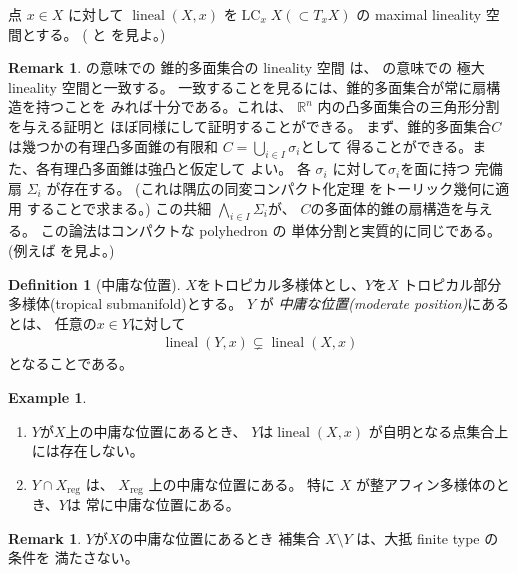 \documentclass[a4paper,dvipdfmx,reqno,12pt]{amsart}
\theoremstyle{definition}
\newtheorem{definition}[theorem]{Definition}
\newtheorem{example}[theorem]{Example}
\newtheorem{remark}[theorem]{Remark}
\newcommand{\opn}[1]{\operatorname{#1}}
\numberwithin{equation}{section}
\begin{document}
点 $x\in X$ に対して
$\opn{lineal}(X,x)$ を$\opn{LC}_x X (\subset T_x X)$
の maximal lineality 空間とする。
(\cite[]{MR4246795} と
\cite[]{demedrano2023chern} を見よ。)



\begin{remark}
\cite[]{MR3041763}の意味での
錐的多面集合の lineality 空間
は、
\cite[]{MR4246795}の意味での
極大 lineality 空間と一致する。
一致することを見るには、錐的多面集合が常に扇構造を持つことを
みれば十分である。これは、
$\mathbb{R}^{n}$ 内の凸多面集合の三角形分割を与える証明と
ほぼ同様にして証明することができる。
まず、錐的多面集合$C$は幾つかの有理凸多面錐の有限和
$C=\bigcup_{i\in I}\sigma_i$として
得ることができる。また、各有理凸多面錐は強凸と仮定して
よい。
各 $\sigma_i$ に対して$\sigma_i$を面に持つ
完備扇 $\Sigma_i$ が存在する。
(これは隅広の同変コンパクト化定理
\cite[Theorem 3]{MR337963}をトーリック幾何に適用
することで求まる。)
この共細 $\bigwedge_{i\in I}\Sigma_i$が、
$C$の多面体的錐の扇構造を与える。
この論法はコンパクトな polyhedron の
単体分割と実質的に同じである。
(例えば\cite[Theorem 2.11]{MR665919}
を見よ。)
\end{remark}

\begin{definition}[{中庸な位置}]
\label{definition-permissible-position}
$X$をトロピカル多様体とし、$Y$を$X$
トロピカル部分多様体(tropical submanifold)とする。
$Y$ が \emph{中庸な位置(moderate position)}にあるとは、
任意の$x\in Y$に対して
\begin{align}
     \opn{lineal}(Y,x) \subsetneq
 \opn{lineal}(X,x)
\end{align}
となることである。
\end{definition}

\begin{example}
\begin{enumerate}
\item $Y$が$X$上の中庸な位置にあるとき、
$Y$は$\opn{lineal}(X,x)$
が自明となる点集合上には存在しない。
\item $Y\cap X_{\mathrm{reg}}$ は、
$X_{\mathrm{reg}}$ 上の中庸な位置にある。
特に $X$ が整アフィン多様体のとき、$Y$は
常に中庸な位置にある。
\end{enumerate}

\end{example}

\begin{remark}
$Y$が$X$の中庸な位置にあるとき
補集合 $X\setminus Y$ は、大抵 finite type の条件を
満たさない。
\end{remark}
\end{document}
